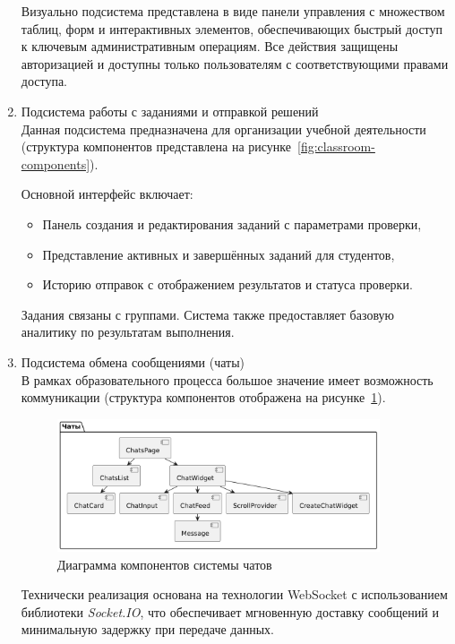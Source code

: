 \begin{enumerate}
  Визуально подсистема представлена в виде панели управления с множеством таблиц, форм и интерактивных элементов, обеспечивающих быстрый доступ к ключевым административным операциям. Все действия защищены авторизацией и доступны только пользователям с соответствующими правами доступа.

  \item Подсистема работы с заданиями и отправкой решений\\
  Данная подсистема предназначена для организации учебной деятельности (структура компонентов представлена на рисунке~\ref{fig:classroom-components}).
  
  Основной интерфейс включает:
  \begin{itemize}
    \item Панель создания и редактирования заданий с параметрами проверки,
    \item Представление активных и завершённых заданий для студентов,
    \item Историю отправок с отображением результатов и статуса проверки.
  \end{itemize}
  
  Задания связаны с группами. Система также предоставляет базовую аналитику по результатам выполнения.

  \item Подсистема обмена сообщениями (чаты)\\
  В рамках образовательного процесса большое значение имеет возможность коммуникации (структура компонентов отображена на рисунке~\ref{fig:chat-components}).
    
  \begin{figure}[h]
    \centering
    \includegraphics[width=0.9\textwidth]{static/diagrams/ChatsComponentDiagram.png}
    \caption{Диаграмма компонентов системы чатов}
    \label{fig:chat-components}
  \end{figure}
    
  Технически реализация основана на технологии WebSocket с использованием библиотеки \textit{Socket.IO}, что обеспечивает мгновенную доставку сообщений и минимальную задержку при передаче данных.
  

\end{enumerate}
